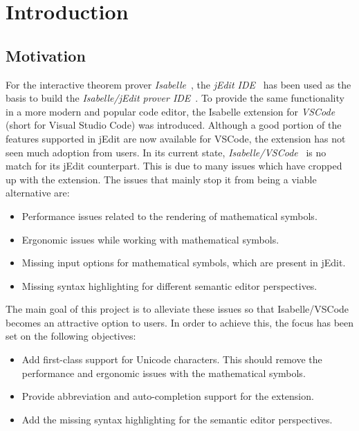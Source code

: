 
\chapter{Introduction}
\label{chapter:introduction}

\section{Motivation}
For the interactive theorem prover \emph{Isabelle}~\parencite{lpi}, the \emph{jEdit IDE}~\parencite{jedit} has been used as the basis to build the \emph{Isabelle/jEdit prover IDE}~\parencite{isabelle_jedit}. To provide the same functionality in a more modern and popular code editor, the Isabelle extension for \emph{VSCode}~\parencite{vscode} (short for Visual Studio Code) was introduced. Although a good portion of the features supported in jEdit are now available for VSCode, the extension has not seen much adoption from users. In its current state, \emph{Isabelle/VSCode}~\parencite{pide} is no match for its jEdit counterpart. This is due to many issues which have cropped up with the extension. The issues that mainly stop it from being a viable alternative are:
\begin{itemize}
    \item Performance issues related to the rendering of mathematical symbols.
    \item Ergonomic issues while working with mathematical symbols.
    \item Missing input options for mathematical symbols, which are present in jEdit.
    \item Missing syntax highlighting for different semantic editor perspectives.
\end{itemize}

The main goal of this project is to alleviate these issues so that Isabelle/VSCode becomes an attractive option to users. In order to achieve this, the focus has been set on the following objectives:
\begin{itemize}
    \item Add first-class support for Unicode characters. This should remove the performance and ergonomic issues with the mathematical symbols.
    \item Provide abbreviation and auto-completion support for the extension.
    \item Add the missing syntax highlighting for the semantic editor perspectives.
\end{itemize}

